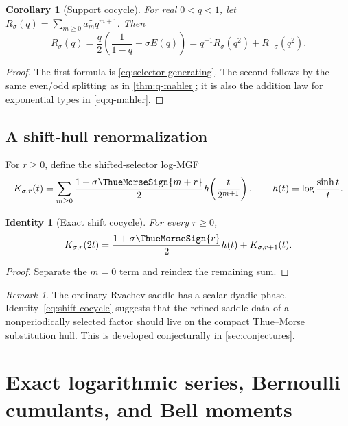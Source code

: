 \documentclass[11pt,oneside]{article}
\numberwithin{equation}{section}
\newtheorem{corollary}[theorem]{Corollary}
\newtheorem{identity}[theorem]{Identity}
\theoremstyle{definition}
\theoremstyle{remark}
\newtheorem{remark}[theorem]{Remark}
\begin{document}
\begin{corollary}[Support cocycle]
\label{cor:support-cocycle}
For real $0<q<1$, let
\(
 R_\sigma(q)=\sum_{m\ge0}a_m^\sigma q^{m+1}.
\)
Then
\begin{equation}
 R_\sigma(q)=\frac q2\left(\frac1{1-q}+\sigma E(q)\right)
 =q^{-1}R_\sigma(q^2)+R_{-\sigma}(q^2).
 \label{eq:support-cocycle}
\end{equation}
\end{corollary}

\begin{proof}
The first formula is \eqref{eq:selector-generating}.  The second follows by the same
even/odd splitting as in \cref{thm:q-mahler}; it is also the addition law for exponential
types in \eqref{eq:q-mahler}.
\end{proof}

\subsection{A shift-hull renormalization}

For $r\ge0$, define the shifted-selector log-MGF
\begin{equation}
 K_{\sigma,r}(t)=\sum_{m\ge0}\frac{1+\sigma\ThueMorseSign{m+r}}2
 h\!\left(\frac{t}{2^{m+1}}\right),
 \qquad
 h(t)=\log\frac{\sinh t}{t}.
 \label{eq:shifted-K}
\end{equation}

\begin{identity}[Exact shift cocycle]
\label{id:shift-cocycle}
For every $r\ge0$,
\begin{equation}
 K_{\sigma,r}(2t)
 =\frac{1+\sigma\ThueMorseSign{r}}{2}h(t)+K_{\sigma,r+1}(t).
 \label{eq:shift-cocycle}
\end{equation}
\end{identity}

\begin{proof}
Separate the $m=0$ term and reindex the remaining sum.
\end{proof}

\begin{remark}
The ordinary Rvachev saddle has a scalar dyadic phase.  Identity~\eqref{eq:shift-cocycle}
suggests that the refined saddle data of a nonperiodically selected factor should live on
the compact Thue--Morse substitution hull.  This is developed conjecturally in
\cref{sec:conjectures}.
\end{remark}

\section{Exact logarithmic series, Bernoulli cumulants, and Bell moments}
\label{sec:cumulants}
\end{document}
